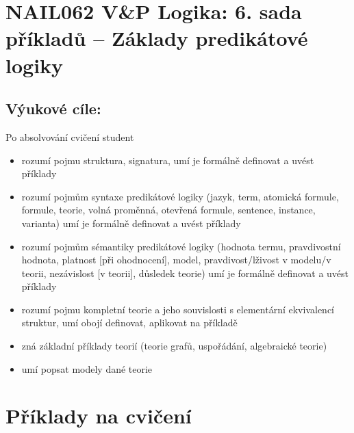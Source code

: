 \section*{NAIL062 V\&P Logika: 6. sada příkladů -- Základy predikátové logiky}


\subsection*{Výukové cíle:} Po absolvování cvičení student

\begin{itemize}\setlength{\itemsep}{0pt}
    \item rozumí pojmu struktura, signatura, umí je formálně definovat a uvést příklady
    \item rozumí pojmům syntaxe predikátové logiky (jazyk, term, atomická formule, formule, teorie, volná proměnná, otevřená formule, sentence, instance, varianta) umí je formálně definovat a uvést příklady
    \item rozumí pojmům sémantiky predikátové logiky (hodnota termu, pravdivostní hodnota, platnost [při ohodnocení], model, pravdivost/lživost v modelu/v teorii, nezávislost [v teorii], důsledek teorie) umí je formálně definovat a uvést příklady
    \item rozumí pojmu kompletní teorie a jeho souvislosti s elementární ekvivalencí struktur, umí obojí definovat, aplikovat na příkladě
    \item zná základní příklady teorií (teorie grafů, uspořádání, algebraické teorie)
    \item umí popsat modely dané teorie    
\end{itemize}
    

\section*{Příklady na cvičení}


